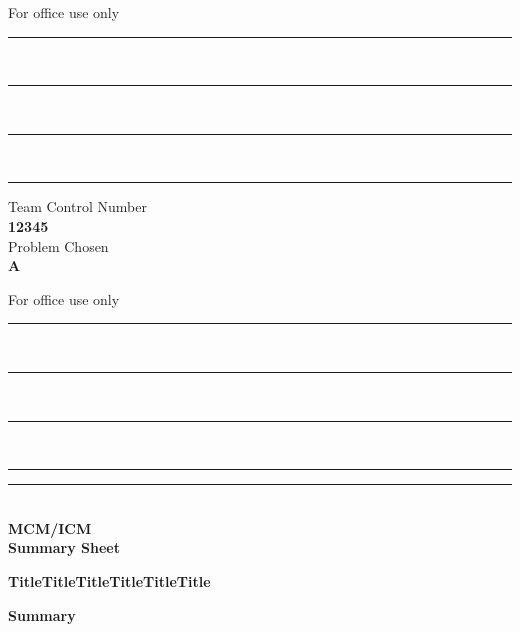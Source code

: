 \documentclass[a4paper,12pt]{article}
\begin{document}
	\pagestyle{empty}%
	\null%
	\vspace*{-6pc}%
	\begin{center}
		\begingroup
		\setlength{\parindent}{0pt}
		\begin{minipage}{0.28\linewidth}
			For office use only\\[4pt]
			\rule[-2pt]{0.85\linewidth}{0.5pt}\\[4pt]
			\rule[-2pt]{0.85\linewidth}{0.5pt}\\[4pt]
			\rule[-2pt]{0.85\linewidth}{0.5pt}\\[4pt]
			\rule[-2pt]{0.85\linewidth}{0.5pt}
		\end{minipage}%
		\begin{minipage}{0.44\linewidth}
			\centering
			Team Control Number\\[0.7pc]
			{\color{red}\LARGE\textbf{12345}}\\[1.8pc]                                 %
			Problem Chosen\\[0.7pc]
			{\color{red}\Huge\textbf{A}}                                                %
		\end{minipage}%
		\begin{minipage}{0.28\linewidth}
			For office use only\\[4pt]
			\rule[-2pt]{0.85\linewidth}{0.5pt}\\[4pt]
			\rule[-2pt]{0.85\linewidth}{0.5pt}\\[4pt]
			\rule[-2pt]{0.85\linewidth}{0.5pt}\\[4pt]
			\rule[-2pt]{0.85\linewidth}{0.5pt}
		\end{minipage}
		\par
		\vskip 10pt
		\rule{\linewidth}{0.5pt}\par
			\textbf{{\the\year}\\%
				\vspace*{-4mm}                 %
			MCM/ICM \\
			\vspace*{-5mm}
			Summary Sheet}%
		\endgroup
		\vskip 10pt
	\end{center}
\vspace*{-10mm}
\begin{center}
	\textbf{TitleTitleTitleTitleTitleTitle}                              %
\end{center}
\begin{center}
	\vspace*{-5mm}
	\textbf{Summary}
\end{center}
\end{document}

